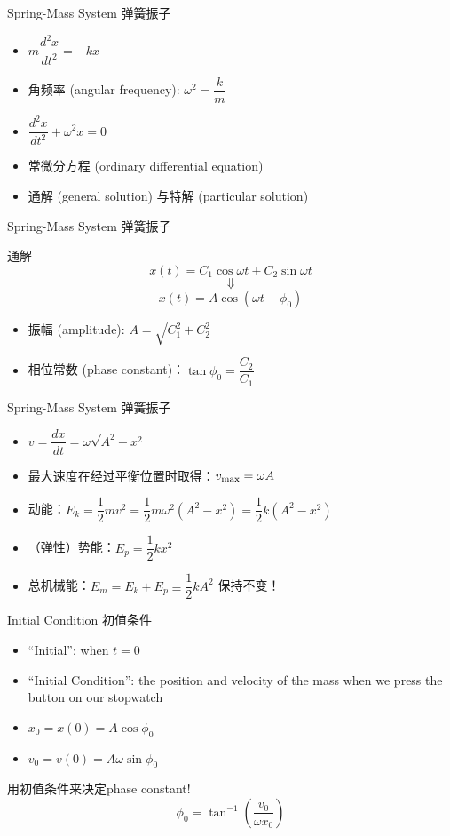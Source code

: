 \documentclass{beamer}
\begin{document}
\begin{frame}{Spring-Mass System 弹簧振子}
	\begin{itemize}
		\item $m\dfrac{d^2 x}{dt^2} = -kx$
		\item 角频率 (angular frequency): $\omega^2 = \dfrac{k}{m}$
		\item $\dfrac{d^2 x}{dt^2} + \omega^2 x = 0$
		\item 常微分方程 (ordinary differential equation)
		\item 通解 (general solution) 与特解 (particular solution)
	\end{itemize}
\end{frame}

\begin{frame}{Spring-Mass System 弹簧振子}
	\begin{block}{通解}
		\[x\left(t\right) = C_1 \cos \omega t + C_2 \sin \omega t\]
		\[\Downarrow\]
		\[x\left(t\right) = A \cos \left(\omega t + \phi_0\right)\]
	\end{block}
	\begin{itemize}
		\item 振幅 (amplitude): $A = \sqrt{C_1^2 + C_2^2}$
		\item 相位常数 (phase constant)：$\tan \phi_0 = \dfrac{C_2}{C_1}$
	\end{itemize}
\end{frame}

\begin{frame}{Spring-Mass System 弹簧振子}
	\begin{itemize}
		\item $v = \dfrac{dx}{dt} = \omega \sqrt{A^2 - x^2}$
		\item 最大速度在经过平衡位置时取得：$v_{\rm max} = \omega A$
		\item 动能：$E_k = \dfrac{1}{2} m v^2 = \dfrac{1}{2} m \omega^2 \left(A^2 - x^2\right) = \dfrac{1}{2} k \left(A^2 - x^2\right)$
		\item （弹性）势能：$E_p = \dfrac{1}{2} k x^2$
		\item 总机械能：$E_m = E_k + E_p \equiv \dfrac{1}{2} k A^2$ 保持不变！
	\end{itemize}
\end{frame}

\begin{frame}{Initial Condition 初值条件}
	\begin{itemize}
		\item ``Initial'': when $t = 0$
		\item ``Initial Condition'': the position and velocity of the mass when we press the button on our stopwatch
		\item $x_0 = x\left(0\right) = A \cos \phi_0$
		\item $v_0 = v\left(0\right) = A\omega \sin \phi_0$
	\end{itemize}
	\begin{block}{用初值条件来决定phase constant!}
		\[\phi_0 = \tan^{-1}\left(\frac{v_0}{\omega x_0}\right)\]
	\end{block}
\end{frame}
\end{document}
